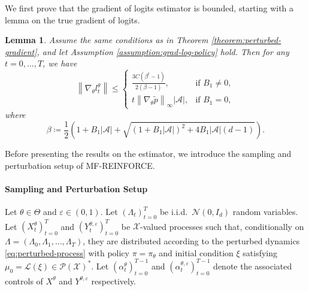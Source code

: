 \documentclass[11pt]{article}
\numberwithin{equation}{section}
\newtheorem{lemma}[theorem]{Lemma}
\theoremstyle{definition}
\theoremstyle{remark}
\def\eps{\varepsilon}
\def\cA{\mathcal{A}}
\def\cX{\mathcal{X}}
\begin{document}
We first prove that the gradient of logits estimator is bounded, starting with a lemma on the true gradient of logits.
\begin{lemma}
    \label{lemma:bound-gradient-logits}
    Assume the same conditions as in Theorem \ref{theorem:perturbed-gradient}, and let Assumption \ref{assumption:grad-log-policy} hold. Then for any $t = 0, \ldots, T$, we have
    \begin{equation}
        \label{eq:bound-gradient-logits}
        \left\| \nabla_\theta l_t^\theta \right\| \leq \begin{cases}
            \frac{3 C (\beta^t - 1)}{2(\beta - 1)}, & \text{if } B_1 \neq 0, \\
            t \left\| \nabla_\theta \tilde p \right\| _\infty | \cA |, & \text{if } B_1 = 0,
        \end{cases}
    \end{equation}
    where 
    \begin{equation}
        \label{eq:definition-beta}
        \beta \coloneq \frac{1}{2} \left( 1 +B_1| \cA | + \sqrt{(1 + B_1| \cA |)^2 + 4 B_1| \cA | (d - 1)} \right).
    \end{equation}
\end{lemma}
Before presenting the results on the estimator, we introduce the sampling and perturbation setup of MF-REINFORCE.
\paragraph{Sampling and Perturbation Setup}
Let $\theta \in \Theta$ and $\eps \in (0,1)$.
Let $(\Lambda_t)_{t = 0}^T$ be i.i.d.\ $\mathcal N(0,I_d)$ random variables.
Let $(X_t^\theta)_{t = 0}^T$ and $(Y_t^{\theta,\eps})_{t = 0}^T$ be $\cX$-valued processes such that,
conditionally on $\Lambda = (\Lambda_0,\Lambda_1,\ldots,\Lambda_{T})$,
they are distributed according to the perturbed dynamics \eqref{eq:perturbed-process}
with policy $\pi=\pi_\theta$ and initial condition $\xi$ satisfying
$\mu_0=\mathcal L(\xi)\in\mathcal P(\cX)^*$.
Let $(\alpha_t^\theta)_{t=0}^{T-1}$ and $(\alpha_t^{\theta,\eps})_{t=0}^{T-1}$ denote the associated controls of $X^\theta$ and $Y^{\theta, \eps}$ respectively.
\end{document}
